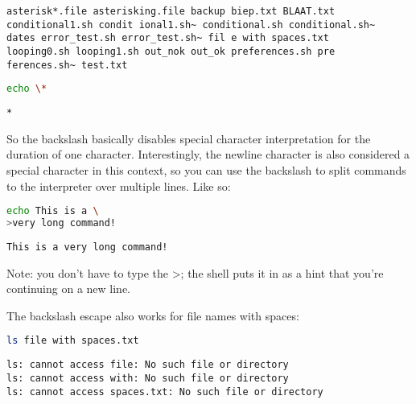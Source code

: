 \scriptsize
\begin{verbatim}
asterisk*.file asterisking.file backup biep.txt BLAAT.txt 
conditional1.sh condit ional1.sh~ conditional.sh conditional.sh~ 
dates error_test.sh error_test.sh~ fil e with spaces.txt 
looping0.sh looping1.sh out_nok out_ok preferences.sh pre
ferences.sh~ test.txt
\end{verbatim}
\normalsize

\lstset{basicstyle=\scriptsize, numbers=left, captionpos=b, tabsize=4}
\begin{lstlisting}[caption=Echoing an asterisk,language={bash},
breaklines=true,xleftmargin=15pt,label=lst:Echoing an asterisk]
echo \*
\end{lstlisting}

\scriptsize
\begin{verbatim}
*
\end{verbatim}
\normalsize

So the backslash basically disables special character interpretation for the
duration of one character. Interestingly, the newline character is also
considered a special character in this context, so you can use the backslash to
split commands to the interpreter over multiple lines. Like so:

\lstset{basicstyle=\scriptsize, numbers=left, captionpos=b, tabsize=4}
\begin{lstlisting}[caption=A multiline command,language={bash},
breaklines=true,xleftmargin=15pt,label=lst:A multiline command]
echo This is a \
>very long command!
\end{lstlisting}

\scriptsize
\begin{verbatim}
This is a very long command!
\end{verbatim}
\normalsize

Note: you don't have to type the \textgreater{}; the shell puts it in as a hint
that you're continuing on a new line.

The backslash escape also works for file names with spaces:

\lstset{basicstyle=\scriptsize, numbers=left, captionpos=b, tabsize=4}
\begin{lstlisting}[caption=Difficult file to list...,language={bash},
breaklines=true,xleftmargin=15pt,label=lst:Difficult file to list...]
ls file with spaces.txt
\end{lstlisting}

\scriptsize
\begin{verbatim}
ls: cannot access file: No such file or directory
ls: cannot access with: No such file or directory
ls: cannot access spaces.txt: No such file or directory
\end{verbatim}
\normalsize

